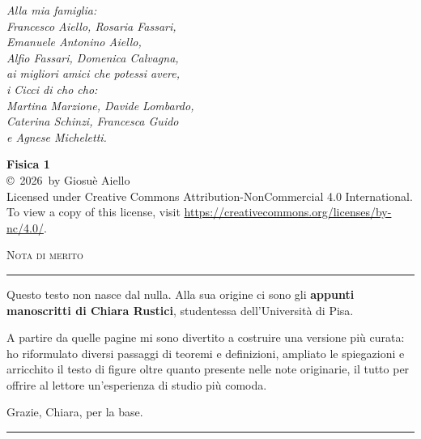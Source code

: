 \documentclass[oneside,openany,titlepage,fleqn,
	headinclude,12pt,a4paper,footinclude]{scrbook}
\newcommand{\myName}{Giosuè Aiello\xspace}
\newcommand{\myTime}{2026\xspace}
\newcommand{\suppresspagenumber}{\clearpairofpagestyles}
\begin{document}
\frenchspacing
\raggedbottom
\setcounter{page}{1} %
\suppresspagenumber %
\pagestyle{scrheadings} %


\begin{flushright}
\vspace*{1cm}
\emph{Alla mia famiglia:\\
Francesco Aiello, Rosaria Fassari,\\
Emanuele Antonino Aiello,\\
Alfio Fassari, Domenica Calvagna,\\
ai migliori amici che potessi avere,\\
i Cicci di cho cho:\\
Martina Marzione, Davide Lombardo,\\
Caterina Schinzi, Francesca Guido\\
e Agnese Micheletti.}
\end{flushright}

\vfill
\noindent
\textbf{Fisica 1} \\
\copyright\ \myTime \ by \myName \\

\noindent
{\Large \ccbync} Licensed under Creative Commons Attribution-NonCommercial 4.0 International. \\
To view a copy of this license, visit \url{https://creativecommons.org/licenses/by-nc/4.0/}.

\clearpage
\thispagestyle{empty}
\vspace*{\fill}
\begin{center}
    {\Large\scshape\color{notedarkred} Nota di merito \par}
    \vspace{0.7cm}
    {\color{notered}\rule{6cm}{1pt}\par}
    \vspace{1.4cm}

    \begin{minipage}{0.78\textwidth}
        \setlength{\parskip}{0.7em}
        \noindent
        Questo testo non nasce dal nulla. Alla sua origine ci sono gli
        \textbf{appunti manoscritti di Chiara Rustici}, studentessa
        dell'Università di Pisa.

        \noindent
        A partire da quelle pagine mi sono divertito a costruire una versione
        più curata: ho riformulato diversi passaggi di teoremi e definizioni,
        ampliato le spiegazioni e arricchito il testo di figure oltre quanto
        presente nelle note originarie, il tutto per offrire al lettore
        un'esperienza di studio più comoda.

        \noindent
        Grazie, Chiara, per la base.
    \end{minipage}

    \vspace{1.8cm}
    {\color{notered}\rule{3cm}{0.6pt}\par}
\end{center}
\vspace*{\fill}
\end{document}
